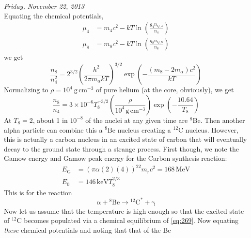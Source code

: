 \documentclass[10pt]{article}
\numberwithin{equation}{section}
\newcommand{\n}{\noindent}
\begin{document}
    \n \textit{Friday, November 22, 2013}\\

    \n Equating the chemical potentials,
     \begin{align}
       \mu_4 &= m_4c^2 - kT\ln\left(\frac{g_4 n_{Q,4}}{n_4}\right)\\
       \mu_8 &= m_8c^2 - kT\ln\left(\frac{g_8 n_{Q,8}}{n_8}\right)
     \end{align}
    we get
    \begin{equation}
      \label{eq:266}
      \frac{n_8}{n_4^2}=2^{3/2}\left(\frac{h^2}{2\pi m_\alpha
          kT}\right)^{3/2}\exp\left(-\frac{(m_8-2m_\alpha) c^2}{kT}\right)
    \end{equation}
    Normalizing to $\rho=10^4\ \mathrm{g\,cm^{-3}}$ of pure helium (at
    the core, obviously), we get
    \begin{equation}
      \label{eq:267}
      \frac{n_8}{n_4}=3\times
      10^{-6}T_8^{-3/2}\left(\frac{\rho}{10^4\,\mathrm{g\,cm^{-3}}}\right)
\exp\left(-\frac{10.64}{T_8}\right) 
    \end{equation}
    At $T_8=2$, about 1 in $10^{-8}$ of the nuclei at any given time
    are ${}^8\mathrm{Be}$. Then another alpha particle can combine
    this a ${}^8\mathrm{Be}$ nucleus creating a ${}^{12}\mathrm{C}$
    nucleus. However, this is actually a carbon nucleus in an excited
    state of carbon that will eventually decay to the ground state
    through a strange process. First though, we note the Gamow energy
    and Gamow peak energy for the Carbon synthesis reaction:
    \begin{align}
      \label{eq:268}
      E_\mathrm{G}&=\left(\pi\alpha(2)(4)\right)^22m_rc^2=168\,\mathrm{MeV}
\\
      \label{eq:268a}
      E_0&=146\,\mathrm{keV}T_8^{2/3}
    \end{align}
    This is for the reaction
    \begin{equation}
      \label{eq:269}
      \mathrm{\alpha+{}^8Be\to{}^{12}C^*+\gamma}
    \end{equation}
    Now let us assume that the temperature is high enough so that the
    excited state of ${}^{12}\mathrm{C}$ becomes populated via a
    chemical equilibrium of \eqref{eq:269}. Now equating
    \textit{these} chemical potentials and noting that that of the Be
\end{document}
